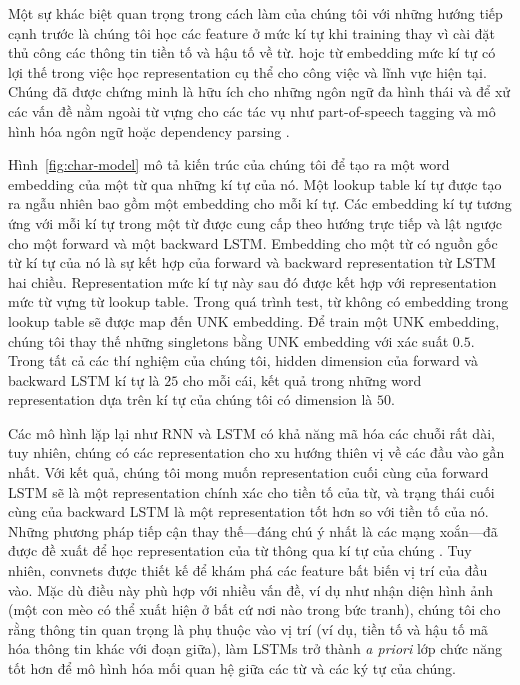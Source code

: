 \documentclass[11pt,letterpaper]{article}
\begin{document}
Một sự khác biệt quan trọng trong cách làm của chúng tôi với những hướng tiếp cạnh trước là chúng tôi học các feature ở mức kí tự khi training thay vì cài đặt thủ công các thông tin tiền tố và hậu tố về từ. hojc từ embedding mức kí tự có lợi thế trong việc học representation cụ thể cho công việc và lĩnh vực hiện tại. Chúng đã được chứng minh là hữu ích cho những ngôn ngữ đa hình thái và để xử các vấn đề nằm ngoài từ vựng cho các tác vụ như part-of-speech tagging và mô hình hóa ngôn ngữ \cite{ling:2015} hoặc dependency parsing \cite{lstmemnlp15}.

Hình~\ref{fig:char-model} mô tả kiến trúc của chúng tôi để tạo ra một word embedding của một từ qua những kí tự của nó. Một lookup table kí tự được tạo ra ngẫu nhiên bao gồm một embedding cho mỗi kí tự. Các embedding kí tự tương ứng với mỗi kí tự trong một từ được cung cấp theo hướng trực tiếp và lật ngược cho một forward và một backward LSTM. Embedding cho một từ có nguồn gốc từ kí tự của nó là sự kết hợp của forward và backward representation từ LSTM hai chiều. Representation mức kí tự này sau đó được kết hợp với representation mức từ vựng từ lookup table. Trong quá trình test, từ không có embedding trong lookup table sẽ được map đến UNK embedding. Để train một UNK embedding, chúng tôi thay thế những singletons bằng UNK embedding với xác suất $0.5$. Trong tất cả các thí nghiệm của chúng tôi, hidden dimension của forward và backward LSTM kí tự là $25$ cho mỗi cái, kết quả trong những word representation dựa trên kí tự của chúng tôi có dimension là $50$. 

Các mô hình lặp lại như RNN và LSTM có khả năng mã hóa các chuỗi rất dài, tuy nhiên, chúng có các representation cho xu hướng thiên vị về các đầu vào gần nhất. Với kết quả, chúng tôi mong muốn representation cuối cùng của forward LSTM sẽ là một representation chính xác cho tiền tố của từ, và trạng thái cuối cùng của backward LSTM là một representation tốt hơn  so với tiền tố của nó. Những phương pháp tiếp cận thay thế---đáng chú ý nhất là các mạng xoắn---đã được đề xuất để học representation của từ thông qua kí tự của chúng \cite{zhang2015character,DBLP:journals/corr/KimJSR15}. Tuy nhiên, convnets được thiết kế để khám phá các feature bất biến vị trí của đầu vào. Mặc dù điều này phù hợp với nhiều vấn đề, ví dụ như nhận diện hình ảnh (một con mèo có thể xuất hiện ở bất cứ nơi nào trong bức tranh), chúng tôi cho rằng thông tin quan trọng là phụ thuộc vào vị trí (ví dụ, tiền tố và hậu tố mã hóa thông tin khác với đoạn giữa), làm LSTMs trở thành \emph{a priori} lớp chức năng tốt hơn để mô hình hóa mối quan hệ giữa các từ và các ký tự của chúng.
\end{document}
